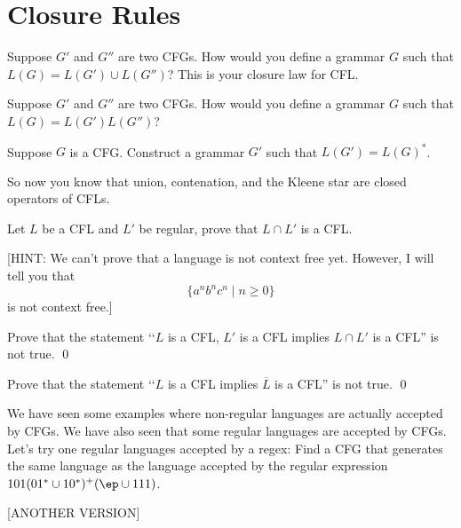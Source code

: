 \section{Closure Rules}

\begin{ex}
Suppose $G'$ and $G''$ are two CFGs.
How would you define a grammar $G$ such that $L(G) = L(G') \cup L(G'')$?
This is your closure law for CFL.
\end{ex}

\newpage
\begin{ex}
Suppose $G'$ and $G''$ are two CFGs.
How would you define a grammar $G$ such that $L(G) = L(G') L(G'')$?
\end{ex}

\newpage
\begin{ex}
Suppose $G$ is a CFG.
Construct a grammar $G'$ such that $L(G') = L(G)^*$. 
\end{ex}

\newpage
So now you know that union, contenation, and the Kleene star are closed 
operators of CFLs.

\newpage
\begin{ex}
Let $L$ be a CFL and $L'$ be regular, prove that $L \cap L'$ is a CFL.
\end{ex}

[HINT: We can't prove that a language is not context free yet.
However, I will tell you that 
\[
\{a^n b^n c^n \mid n \geq 0\}
\]
is not context free.]

\newpage
\begin{ex}
Prove that the statement \lq\lq $L$ is a CFL, $L'$ is a  CFL implies
$L \cap L'$ is a CFL'' is not true.
\qed
\end{ex}

\newpage
\begin{ex}
Prove that the statement \lq\lq $L$ is a CFL implies
$\overline{L}$ is a CFL'' is not true.
\qed
\end{ex}

\newpage
\begin{ex}
We have seen some examples where non-regular languages are actually accepted
by CFGs.
We have also seen that some regular languages are accepted by CFGs.
Let's try one regular languages accepted by a regex:
Find a CFG that generates the same language as the language accepted by 
the regular expression $101(01^* \cup 10^*)^+(\ep \cup 111)$.
\end{ex}

[ANOTHER VERSION]




